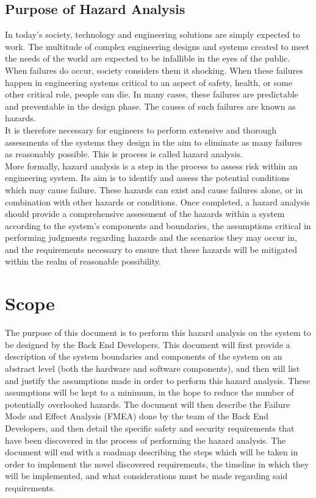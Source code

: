\documentclass{article}
\begin{document}
\subsection{Purpose of Hazard Analysis}


In today's society, technology and engineering solutions are simply expected to work. The multitude of complex engineering designs and systems created to meet the needs of the world are expected to be infallible in the eyes of the public. When failures do occur, society considers them it shocking. When these failures happen in engineering systems critical to an aspect of safety, health, or some other critical role, people can die. In many cases, these failures are predictable and preventable in the design phase. The causes of such failures are known as hazards.\\

It is therefore necessary for engineers to perform extensive and thorough assessments of the systems they design in the aim to eliminate as many failures as reasonably possible. This is process is called hazard analysis.\\

More formally, hazard analysis is a step in the process to assess risk within an engineering system. Its aim is to identify and assess the potential conditions which may cause failure. These hazards can exist and cause failures alone, or in combination with other hazards or conditions. Once completed, a hazard analysis should provide a comprehensive assessment of the hazards within a system according to the system's components and boundaries, the assumptions critical in performing judgments regarding hazards and the scenarios they may occur in, and the requirements necessary to ensure that these hazards will be mitigated within the realm of reasonable possibility.

\section{Scope}

The purpose of this document is to perform this hazard analysis on the system to be designed by the Back End Developers. This document will first provide a description of the system boundaries and components of the system on an abstract level (both the hardware and software components), and then will list and justify the assumptions made in order to perform this hazard analysis. These assumptions will be kept to a minimum, in the hope to reduce the number of potentially overlooked hazards. The document will then describe the Failure Mode and Effect Analysis (FMEA) done by the team of the Back End Developers, and then detail the specific safety and security requirements that have been discovered in the process of performing the hazard analysis. The document will end with a roadmap describing the steps which will be taken in order to implement the novel discovered requirements, the timeline in which they will be implemented, and what considerations must be made regarding said requirements.
\end{document}
